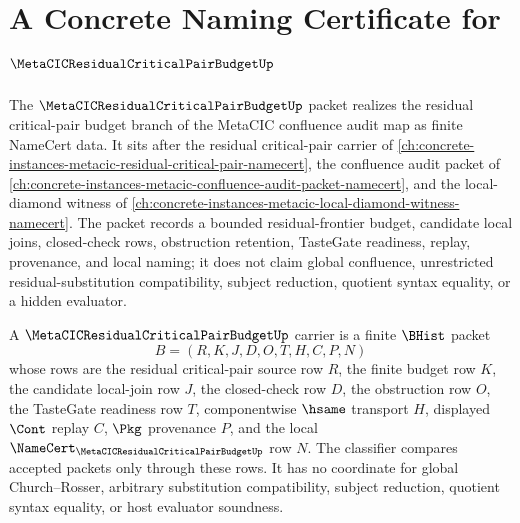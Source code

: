 \chapter{A Concrete Naming Certificate for $\MetaCICResidualCriticalPairBudgetUp$}
\label{ch:concrete-instances-metacic-residual-critical-pair-budget-namecert}

The $\MetaCICResidualCriticalPairBudgetUp$ packet realizes the residual critical-pair budget branch of the MetaCIC confluence audit map as finite NameCert data. It sits after the residual critical-pair carrier of \autoref{ch:concrete-instances-metacic-residual-critical-pair-namecert}, the confluence audit packet of \autoref{ch:concrete-instances-metacic-confluence-audit-packet-namecert}, and the local-diamond witness of \autoref{ch:concrete-instances-metacic-local-diamond-witness-namecert}. The packet records a bounded residual-frontier budget, candidate local joins, closed-check rows, obstruction retention, TasteGate readiness, replay, provenance, and local naming; it does not claim global confluence, unrestricted residual-substitution compatibility, subject reduction, quotient syntax equality, or a hidden evaluator.

\begin{definition}
\label{def:metacic-residual-critical-pair-budget-carrier}
A $\MetaCICResidualCriticalPairBudgetUp$ carrier is a finite $\BHist$ packet
$$
B=(R,K,J,D,O,T,H,C,P,N)
$$
whose rows are the residual critical-pair source row $R$, the finite budget row $K$, the candidate local-join row $J$, the closed-check row $D$, the obstruction row $O$, the TasteGate readiness row $T$, componentwise $\hsame$ transport $H$, displayed $\Cont$ replay $C$, $\Pkg$ provenance $P$, and the local $\NameCert_{\MetaCICResidualCriticalPairBudgetUp}$ row $N$. The classifier compares accepted packets only through these rows. It has no coordinate for global Church--Rosser, arbitrary substitution compatibility, subject reduction, quotient syntax equality, or host evaluator soundness.
\end{definition}

